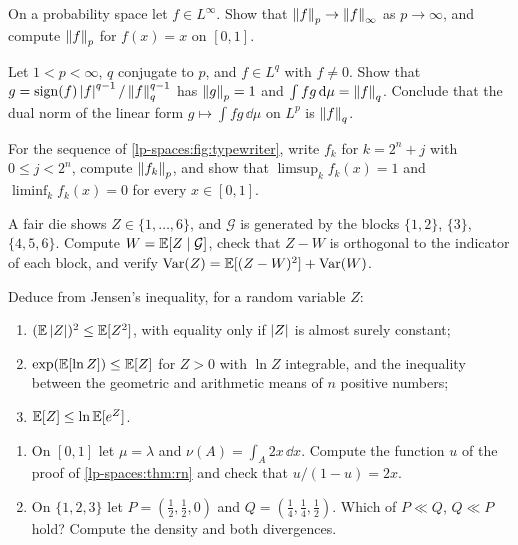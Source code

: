 \begin{notechapter}
\begin{exercise}\label{lp-spaces:exr:2}
On a probability space let $f\in L^\infty$. Show that
$\left\|f\right\|_p\to\left\|f\right\|_\infty$ as $p\to\infty$, and compute $\left\|f\right\|_p$ for
$f(x) = x$ on $[0, 1]$.
\end{exercise}

\begin{exercise}\label{lp-spaces:exr:3}
Let $1 < p < \infty$, $q$ conjugate to $p$, and $f\in L^q$ with
$f\neq0$. Show that $g = \operatorname{sign}(f)\left|f\right|^{q-1}/\left\|f\right\|_q^{q-1}$ has
$\left\|g\right\|_p = 1$ and $\int fg\,\mathrm{d}\mu = \left\|f\right\|_q$. Conclude that the
dual norm of the linear form $g\mapsto\int fg\,\dd\mu$ on $L^p$ is
$\left\|f\right\|_q$.
\end{exercise}

\begin{exercise}\label{lp-spaces:exr:4}
For the sequence of \cref{lp-spaces:fig:typewriter}, write $f_k$ for
$k = 2^n + j$ with $0\leq j < 2^n$, compute $\left\|f_k\right\|_p$, and show
that $\limsup_kf_k(x) = 1$ and $\liminf_kf_k(x) = 0$ for every
$x\in[0, 1]$.
\end{exercise}

\begin{exercise}\label{lp-spaces:exr:5}
A fair die shows $Z\in\{1,\dots,6\}$, and $\mathcal G$ is generated by
the blocks $\{1, 2\}$, $\{3\}$, $\{4, 5, 6\}$. Compute
$W = \mathbb{E}[Z\mid\mathcal G]$, check that $Z - W$ is orthogonal to the
indicator of each block, and verify
$\operatorname{Var}(Z) = \mathbb{E}[(Z - W)^2] + \operatorname{Var}(W)$.
\end{exercise}

\begin{exercise}\label{lp-spaces:exr:6}
Deduce from Jensen's inequality, for a random variable $Z$:
\begin{enumerate}[nosep]
  \item $(\mathbb{E}\left|Z\right|)^2\leq\mathbb{E}[Z^2]$, with equality only if $\left|Z\right|$ is
        almost surely constant;
  \item $\exp(\mathbb{E}[\ln Z])\leq\mathbb{E}[Z]$ for $Z > 0$ with $\ln Z$ integrable,
        and the inequality between the geometric and arithmetic means
        of $n$ positive numbers;
  \item $\mathbb{E}[Z]\leq\ln\mathbb{E}[e^Z]$.
\end{enumerate}
\end{exercise}

\begin{exercise}\label{lp-spaces:exr:7}
\begin{enumerate}[nosep]
  \item On $[0, 1]$ let $\mu = \lambda$ and
        $\nu(A) = \int_A2x\,\dd x$. Compute the function $u$ of the
        proof of \cref{lp-spaces:thm:rn} and check that
        $u/(1 - u) = 2x$.
  \item On $\{1, 2, 3\}$ let $P = (\frac12, \frac12, 0)$ and
        $Q = (\frac14, \frac14, \frac12)$. Which of $P\ll Q$, $Q\ll P$
        hold? Compute the density and both divergences.
\end{enumerate}
\end{exercise}


\end{notechapter}
